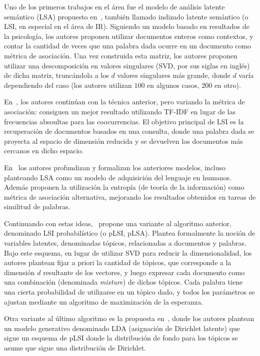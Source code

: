 Uno de los primeros trabajos en el área fue el modelo de análisis latente semántico (LSA) propuesto
en~\cite{Dumais1988}, también llamado indizado latente semántico (o LSI, en especial en el área de
IR). Siguiendo un modelo basado en resultados de la psicología, los autores proponen utilizar
documentos enteros como contextos, y contar la cantidad de veces que una palabra dada ocurre en un
documento como métrica de asociación. Una vez construida esta matriz, los autores proponen utilizar
una descomposición en valores singulares (SVD, por sus siglas en inglés) de dicha matriz,
truncándola a los $d$ valores singulares más grande, donde $d$ varía dependiendo del caso (los
autores utilizan $100$ en algunos casos, $200$ en otro).

En~\cite{Deerwester1990}, los autores continúan con la técnica anterior, pero variando la métrica de
asociación: consiguen un mejor resultado utilizando TF-IDF en lugar de las frecuencias absoultas
para las coocurrencias. El objetivo principal de LSI es la recuperación de documentos basados en una
consulta, donde una palabra dada se proyecta al espacio de dimensión reducida y se devuelven los
documentos más cercanos en dicho espacio.

En~\cite{LandauerDumais1997} los autores profundizan y formalizan los anteriores modelos, incluso
planteando LSA como un modelo de adquisición del lenguaje en humanos. Además proponen la utilización
la entropía (de teoría de la información) como métrica de asociación alternativa, mejorando los
resultados obtenidos en tareas de similitud de palabras.

Continuando con estas ideas,~\cite{Hoffman1999} propone una variante al algoritmo anterior,
denominado LSI probabilístico (o pLSI, pLSA). Plantea formalmente la noción de variables latentes,
denominadas tópicos, relacionadas a documentos y palabras. Bajo este esquema, en lugar de utilizar
SVD para reducir la dimensionalidad, los autores plantean fijar a priori la cantidad de tópicos, que
corresponde a la dimensión $d$ resultante de los vectores, y luego expresar cada documento como una
combinación (denominada \textit{mixture}) de dichos tópicos. Cada palabra tiene una cierta
probabilidad de utilizarse en un tópico dado, y todos los parámetros se ajustan mediante un
algoritmo de maximización de la esperanza.

Otra variante al último algoritmo es la propuesta en~\cite{Blei2003}, donde los autores plantean un
modelo generativo denominado LDA (asignación de Dirichlet latente) que sigue un esquema de pLSI
donde la distribución de fondo para los tópicos se asume que sigue una distribución de Dirichlet.


